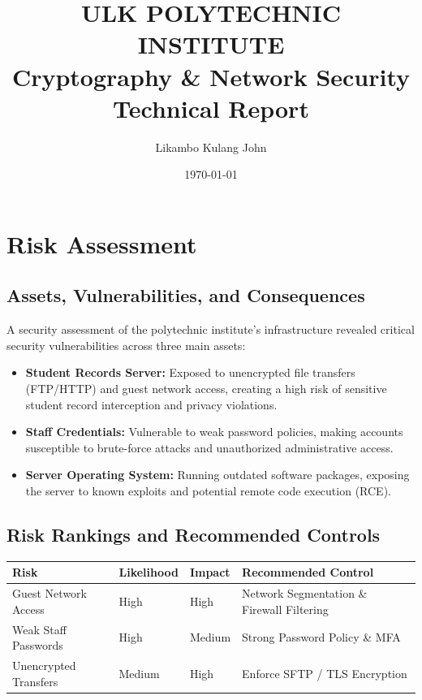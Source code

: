 \documentclass[12pt,a4paper]{article}
\title{\textbf{ULK POLYTECHNIC INSTITUTE}\\[0.5em]\Large Cryptography \& Network Security Technical Report}
\author{Likambo Kulang John}
\date{\today}
\begin{document}
\maketitle

\section{Risk Assessment}
\subsection{Assets, Vulnerabilities, and Consequences}
A security assessment of the polytechnic institute's infrastructure revealed critical security vulnerabilities across three main assets:
\begin{itemize}
    \item \textbf{Student Records Server:} Exposed to unencrypted file transfers (FTP/HTTP) and guest network access, creating a high risk of sensitive student record interception and privacy violations.
    \item \textbf{Staff Credentials:} Vulnerable to weak password policies, making accounts susceptible to brute-force attacks and unauthorized administrative access.
    \item \textbf{Server Operating System:} Running outdated software packages, exposing the server to known exploits and potential remote code execution (RCE).
\end{itemize}

\subsection{Risk Rankings and Recommended Controls}
\begin{table}[h!]
\centering
\begin{tabular}{@{}llll@{}}
\toprule
\textbf{Risk} & \textbf{Likelihood} & \textbf{Impact} & \textbf{Recommended Control} \\ \midrule
Guest Network Access & High & High & Network Segmentation \& Firewall Filtering \\
Weak Staff Passwords & High & Medium & Strong Password Policy \& MFA \\
Unencrypted Transfers & Medium & High & Enforce SFTP / TLS Encryption \\ \bottomrule
\end{tabular}
\end{table}
\end{document}

